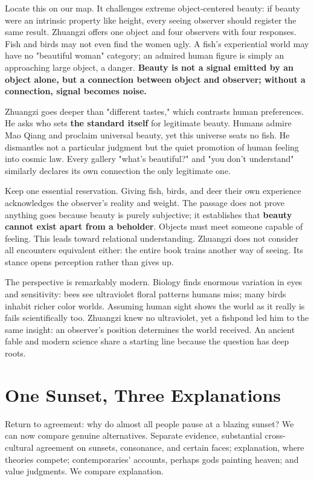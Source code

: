 Locate this on our map. It challenges extreme object-centered beauty: if beauty were an intrinsic property like height, every seeing observer should register the same result. Zhuangzi offers one object and four observers with four responses. Fish and birds may not even find the women ugly. A fish's experiential world may have no "beautiful woman" category; an admired human figure is simply an approaching large object, a danger. \textbf{Beauty is not a signal emitted by an object alone, but a connection between object and observer; without a connection, signal becomes noise.}

Zhuangzi goes deeper than "different tastes," which contrasts human preferences. He asks who sets \textbf{the standard itself} for legitimate beauty. Humans admire Mao Qiang and proclaim universal beauty, yet this universe seats no fish. He dismantles not a particular judgment but the quiet promotion of human feeling into cosmic law. Every gallery "what's beautiful?" and "you don't understand" similarly declares its own connection the only legitimate one.

Keep one essential reservation. Giving fish, birds, and deer their own experience acknowledges the observer's reality and weight. The passage does not prove anything goes because beauty is purely subjective; it establishes that \textbf{beauty cannot exist apart from a beholder}. Objects must meet someone capable of feeling. This leads toward relational understanding. Zhuangzi does not consider all encounters equivalent either: the entire book trains another way of seeing. Its stance opens perception rather than gives up.

The perspective is remarkably modern. Biology finds enormous variation in eyes and sensitivity: bees see ultraviolet floral patterns humans miss; many birds inhabit richer color worlds. Assuming human sight shows the world as it really is fails scientifically too. Zhuangzi knew no ultraviolet, yet a fishpond led him to the same insight: an observer's position determines the world received. An ancient fable and modern science share a starting line because the question has deep roots.

\section{One Sunset, Three Explanations}
Return to agreement: why do almost all people pause at a blazing sunset? We can now compare genuine alternatives. Separate evidence, substantial cross-cultural agreement on sunsets, consonance, and certain faces; explanation, where theories compete; contemporaries' accounts, perhaps gods painting heaven; and value judgments. We compare explanation.


